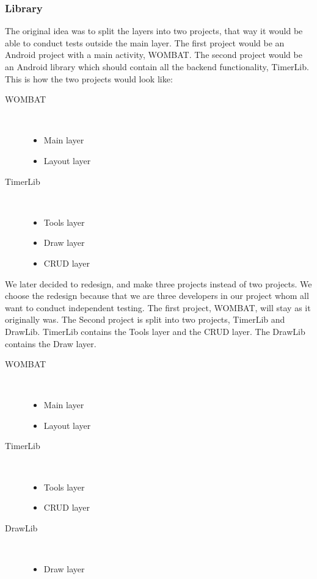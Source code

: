 \subsubsection{Library}

The original idea was to split the layers into two projects, that way it would be able to conduct tests outside the main layer. The first project would be an Android project with a main activity, WOMBAT. The second project would be an Android library which should contain all the backend functionality, TimerLib. This is how the two projects would look like:

\begin{description}
  \item[WOMBAT] \hfill \\\begin{itemize}  \item Main layer  \item Layout layer
\end{itemize}
  \item[TimerLib] \hfill \\\begin{itemize}  \item Tools layer  \item Draw layer  \item CRUD layer
\end{itemize}
\end{description}

We later decided to redesign, and make three projects instead of two projects. We choose the redesign because that we are three developers in our project whom all want to conduct independent testing. The first project, WOMBAT, will stay as it originally was. The Second project is split into two projects, TimerLib and DrawLib. TimerLib contains the Tools layer and the CRUD layer. The DrawLib contains the Draw layer.

\begin{description}
  \item[WOMBAT] \hfill \\\begin{itemize}  \item Main layer  \item Layout layer\end{itemize}
  \item[TimerLib] \hfill \\\begin{itemize}  \item Tools layer  \item CRUD layer
\end{itemize}
  \item[DrawLib] \hfill \\\begin{itemize}  \item Draw layer\end{itemize}
\end{description}

